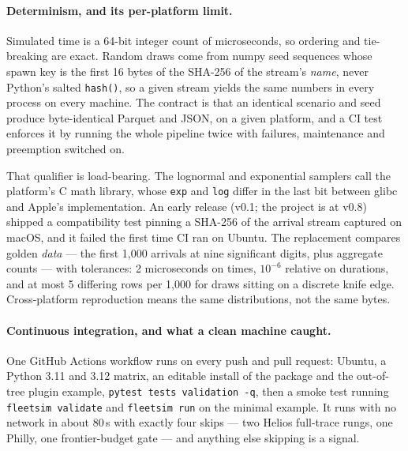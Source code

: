 \paragraph{Determinism, and its per-platform limit.} Simulated time is a
64-bit integer count of microseconds, so ordering and tie-breaking are exact.
Random draws come from numpy seed sequences whose spawn key is the first 16
bytes of the SHA-256 of the stream's \emph{name}, never Python's salted
\texttt{hash()}, so a
given stream yields the same numbers in every process on every machine. The
contract is that an identical scenario and seed produce byte-identical Parquet
and JSON, on a given platform, and a CI test enforces it by running the whole
pipeline twice with failures, maintenance and preemption switched on.

That qualifier is load-bearing. The lognormal and exponential samplers call
the platform's C math library, whose \texttt{exp} and \texttt{log} differ in
the last bit between glibc and Apple's implementation. An early release (v0.1;
the project is at v0.8) shipped a compatibility test pinning a SHA-256 of the
arrival stream captured on macOS, and it failed the first time CI ran on Ubuntu. The replacement compares golden
\emph{data} --- the first 1,000 arrivals at nine significant digits, plus
aggregate counts --- with tolerances: 2 microseconds on times, $10^{-6}$
relative on durations, and at most 5 differing rows per 1,000 for draws
sitting on a discrete knife edge. Cross-platform reproduction means the same
distributions, not the same bytes.

\paragraph{Continuous integration, and what a clean machine caught.} One
GitHub Actions workflow runs on every push and pull request: Ubuntu, a Python
3.11 and 3.12 matrix, an editable install of the package and the out-of-tree
plugin example, \texttt{pytest tests validation -q}, then a smoke test running
\texttt{fleetsim validate} and \texttt{fleetsim run} on the minimal example.
It runs with no network in about 80\,s with exactly four skips --- two Helios
full-trace rungs, one Philly, one frontier-budget gate --- and anything else
skipping is a signal.

